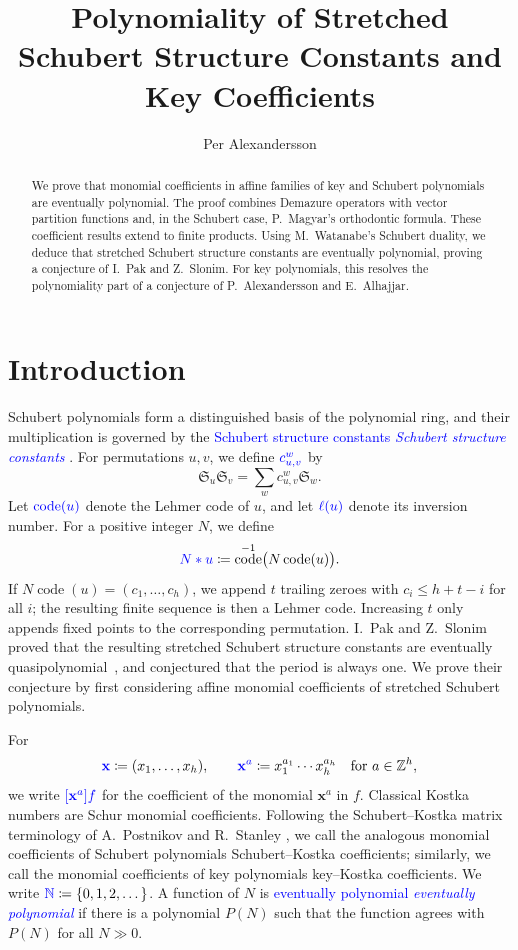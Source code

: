 \documentclass[11pt,reqno]{amsart}
\title[Stretched Schubert and Key Coefficients]
{Polynomiality of Stretched Schubert Structure Constants and Key Coefficients}
\author{Per Alexandersson}
\date{}
\theoremstyle{definition}
\DeclareMathOperator{\code}{code}
\newcommand{\setN}{\mathbb{N}}
\newcommand{\setZ}{\mathbb{Z}}
\newcommand{\xvec}{\mathbf{x}}
\newcommand{\schubertS}{\mathfrak{S}}
\newcommand{\stretchop}{\mathbin{\ast}}
\newcommand{\stretchperm}[2]{#1\stretchop #2}
\newcommand{\defin}[1]{%
  \relax\ifmmode%
  \textcolor{blue}{#1}%
  \else\textcolor{blue}{\emph{#1}}%
  \fi%
}
\begin{document}
\begin{abstract}
We prove that monomial coefficients in affine families of key and Schubert
polynomials are eventually polynomial.  The proof combines Demazure operators
with vector partition functions and, in the Schubert case, P.~Magyar's
orthodontic formula.  These coefficient results extend to finite products.  Using
M.~Watanabe's Schubert duality, we deduce that stretched Schubert structure
constants are eventually polynomial, proving a conjecture of I.~Pak and
Z.~Slonim.  For key polynomials, this resolves the polynomiality part of a
conjecture of P.~Alexandersson and E.~Alhajjar.
\end{abstract}

\maketitle

\section{Introduction}
\label{sec:introduction}

Schubert polynomials form a distinguished basis of the polynomial ring, and
their multiplication is governed by the \defin{Schubert structure constants}.
For permutations \(u,v\), we define
\(\defin{c_{u,v}^w}\) by
\[
\schubertS_u\schubertS_v
=\sum_w c_{u,v}^w\schubertS_w.
\]
Let \(\defin{\code(u)}\) denote the Lehmer code of \(u\), and let
\(\defin{\ell(u)}\) denote its inversion number.  For a positive integer
\(N\), we define
\[
\defin{\stretchperm{N}{u}}\coloneqq\code^{-1}\bigl(N\code(u)\bigr).
\]
If \(N\code(u)=(c_1,\dotsc,c_h)\), we append \(t\) trailing zeroes with
\(c_i\leq h+t-i\) for all \(i\); the resulting finite sequence is then a
Lehmer code.  Increasing \(t\) only appends fixed points to the corresponding
permutation.
I.~Pak and Z.~Slonim proved that the resulting stretched Schubert structure
constants are eventually quasipolynomial~\cite{PakSlonim2026x}, and
conjectured that the period is always one.  We prove their conjecture by first
considering affine monomial coefficients of stretched Schubert polynomials.

For
\[
\defin{\xvec}\coloneqq(x_1,\dotsc,x_h),
\qquad
\defin{\xvec^a}\coloneqq x_1^{a_1}\dotsm x_h^{a_h}
\quad\text{for }a\in\setZ^h,
\]
we write \(\defin{[\xvec^a]f}\) for the coefficient of the monomial
\(\xvec^a\) in \(f\).
Classical Kostka numbers are Schur monomial coefficients.  Following the
Schubert--Kostka matrix terminology of A.~Postnikov and R.~Stanley
\cite[Sec.~17]{PostnikovStanley2008}, we call the analogous monomial
coefficients of Schubert polynomials Schubert--Kostka coefficients; similarly,
we call the monomial coefficients of key polynomials key--Kostka coefficients.
We write
\(\defin{\setN}\coloneqq\{0,1,2,\dotsc\}\).  A function of \(N\) is
\defin{eventually polynomial} if there is a polynomial \(P(N)\) such that the
function agrees with \(P(N)\) for all \(N\gg0\).
\end{document}
